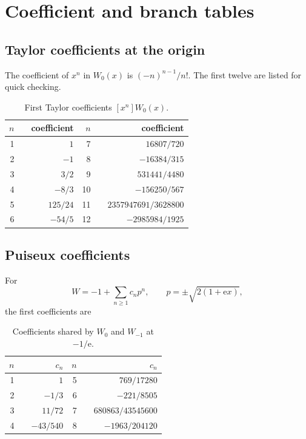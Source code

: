 \documentclass[11pt]{article}
\numberwithin{equation}{section}
\theoremstyle{definition}
\theoremstyle{remark}
\newcommand{\e}{\mathrm e}
\begin{document}
\appendix

\section{Coefficient and branch tables}
\label{app:tables}

\subsection{Taylor coefficients at the origin}

The coefficient of $x^n$ in $W_0(x)$ is
$(-n)^{n-1}/n!$.  The first twelve are listed for quick checking.

\begin{table}[htbp]
\centering
\caption{First Taylor coefficients $[x^n]W_0(x)$.}
\label{tab:taylor-coefficients}
\begin{tabular}{@{}rcr@{\qquad}rcr@{}}
\toprule
$n$ & & coefficient & $n$ & & coefficient \\
\midrule
1 && $1$ & 7 && $16807/720$ \\
2 && $-1$ & 8 && $-16384/315$ \\
3 && $3/2$ & 9 && $531441/4480$ \\
4 && $-8/3$ & 10 && $-156250/567$ \\
5 && $125/24$ & 11 && $2357947691/3628800$ \\
6 && $-54/5$ & 12 && $-2985984/1925$ \\
\bottomrule
\end{tabular}
\end{table}

\subsection{Puiseux coefficients}

For
\[
 W=-1+\sum_{n\ge1}c_np^n,
 \qquad
 p=\pm\sqrt{2(1+\e x)},
\]
the first coefficients are
\begin{table}[htbp]
\centering
\caption{Coefficients shared by $W_0$ and $W_{-1}$ at $-1/\e$.}
\label{tab:puiseux-coefficients}
\begin{tabular}{@{}rcr@{\qquad}rcr@{}}
\toprule
$n$ && $c_n$ & $n$ && $c_n$ \\
\midrule
1 && $1$ & 5 && $769/17280$ \\
2 && $-1/3$ & 6 && $-221/8505$ \\
3 && $11/72$ & 7 && $680863/43545600$ \\
4 && $-43/540$ & 8 && $-1963/204120$ \\
\bottomrule
\end{tabular}
\end{table}
\end{document}
